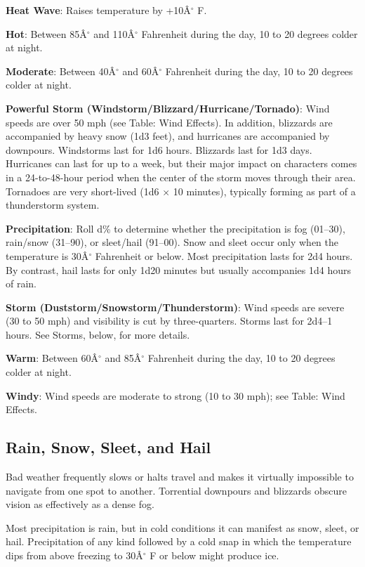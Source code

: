 \textbf{Heat Wave}: Raises temperature by +10\^A\mbox{${}^\circ$} F.
				
\textbf{Hot}: Between 85\^A\mbox{${}^\circ$} and 110\^A\mbox{${}^\circ$} Fahrenheit during the day, 10 to 20 degrees colder at night.
				
\textbf{Moderate}: Between 40\^A\mbox{${}^\circ$} and 60\^A\mbox{${}^\circ$} Fahrenheit during the day, 10 to 20 degrees colder at night.
				
\textbf{Powerful Storm (Windstorm/Blizzard/Hurricane/Tornado)}: Wind speeds are over 50 mph (see Table: Wind Effects). In addition, blizzards are accompanied by heavy snow (1d3 feet), and hurricanes are accompanied by downpours. Windstorms last for 1d6 hours. Blizzards last for 1d3 days. Hurricanes can last for up to a week, but their major impact on characters comes in a 24-to-48-hour period when the center of the storm moves through their area. Tornadoes are very short-lived (1d6 \mbox{$\times$} 10 minutes), typically forming as part of a thunderstorm system. 
				
\textbf{Precipitation}: Roll d\% to determine whether the precipitation is fog (01--30), rain/snow (31--90), or sleet/hail (91--00). Snow and sleet occur only when the temperature is 30\^A\mbox{${}^\circ$} Fahrenheit or below. Most precipitation lasts for 2d4 hours. By contrast, hail lasts for only 1d20 minutes but usually accompanies 1d4 hours of rain.
				
\textbf{Storm (Duststorm/Snowstorm/Thunderstorm)}: Wind speeds are severe (30 to 50 mph) and visibility is cut by three-quarters. Storms last for 2d4--1 hours. See Storms, below, for more details. 
				
\textbf{Warm}: Between 60\^A\mbox{${}^\circ$} and 85\^A\mbox{${}^\circ$} Fahrenheit during the day, 10 to 20 degrees colder at night.
				
\textbf{Windy}: Wind speeds are moderate to strong (10 to 30 mph); see Table: Wind Effects.
				
\subsection{Rain, Snow, Sleet, and Hail}

				
Bad weather frequently slows or halts travel and makes it virtually impossible to navigate from one spot to another. Torrential downpours and blizzards obscure vision as effectively as a dense fog.
				
Most precipitation is rain, but in cold conditions it can manifest as snow, sleet, or hail. Precipitation of any kind followed by a cold snap in which the temperature dips from above freezing to 30\^A\mbox{${}^\circ$} F or below might produce ice. 
				
